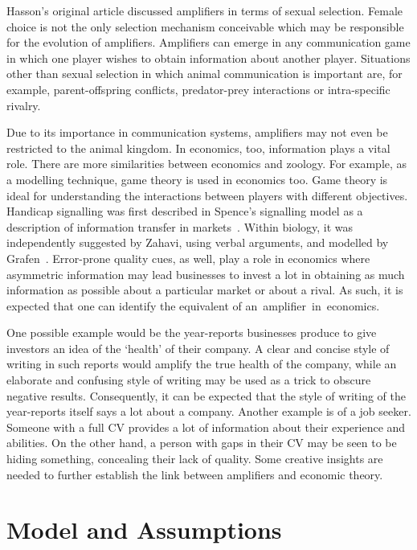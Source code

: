 \documentclass[a4paper,12pt]{article}
\numberwithin{equation}{section}
\begin{document}
Hasson's original article discussed amplifiers in terms of sexual selection. Female choice is not the only selection mechanism conceivable which may be responsible for the evolution of amplifiers. Amplifiers can emerge in any communication game in which one player wishes to obtain information about another player. Situations other than sexual selection in which animal communication is important are, for example, parent-offspring conflicts, predator-prey interactions or intra-specific rivalry. 

Due to its importance in communication systems, amplifiers may not even be restricted to the animal kingdom. In economics, too, information plays a vital role. There are more similarities between economics and zoology. For example, as a modelling technique, game theory is used in economics too. Game theory is ideal for understanding the interactions between players with different objectives. Handicap signalling was first described in Spence's signalling model as a description of information transfer in markets~\cite{Spence1973}. Within biology, it was independently suggested by Zahavi, using verbal arguments, and modelled by Grafen~\cite{Zahavi1975, Zahavi1977, Grafen1990, Grafen1990a}. Error-prone quality cues, as well, play a role in economics where asymmetric information may lead businesses to invest a lot in obtaining as much information as possible about a particular market or about a rival. As such, it is expected that one can identify the equivalent of an~amplifier~in~economics.

One possible example would be the year-reports businesses produce to give investors an idea of the `health' of their company. A clear and concise style of writing in such reports would amplify the true health of the company, while an elaborate and confusing style of writing may be used as a trick to obscure negative results. Consequently, it can be expected that the style of writing of the year-reports itself says a lot about a company. Another example is of a job seeker. Someone with a full CV provides a lot of information about their experience and abilities. On the other hand, a person with gaps in their CV may be seen to be hiding something, concealing their lack of quality. Some creative insights are needed to further establish the link between amplifiers and economic theory.

\newpage


\section{Model and Assumptions}
\label{sec:Model and Assumptions}
\end{document}
